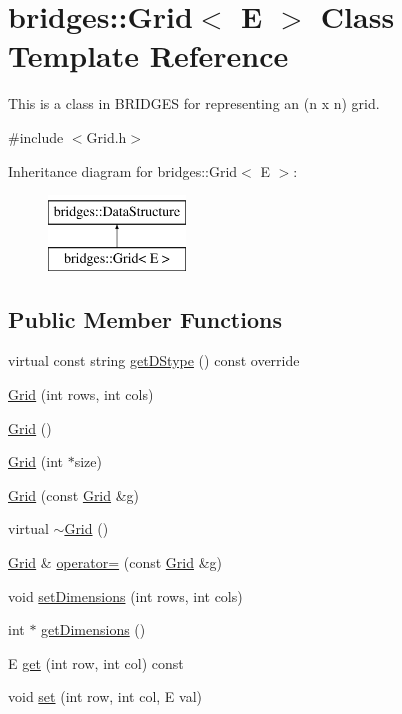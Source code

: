 \hypertarget{classbridges_1_1_grid}{}\section{bridges\+:\+:Grid$<$ E $>$ Class Template Reference}
\label{classbridges_1_1_grid}


This is a class in B\+R\+I\+D\+G\+E\+S for representing an (n x n) grid.  




{\ttfamily \#include $<$Grid.\+h$>$}

Inheritance diagram for bridges\+:\+:Grid$<$ E $>$\+:\begin{figure}[H]
\begin{center}
\leavevmode
\includegraphics[height=2.000000cm]{classbridges_1_1_grid}
\end{center}
\end{figure}
\subsection*{Public Member Functions}
\begin{DoxyCompactItemize}
\item 
virtual const string \hyperlink{classbridges_1_1_grid_a02561695978011f50894938b78969913}{get\+D\+Stype} () const  override
\item 
\hyperlink{classbridges_1_1_grid_af8bb9244c4c713f2325af6d4754ad1e9}{Grid} (int rows, int cols)
\item 
\hyperlink{classbridges_1_1_grid_a711e05a933c2a11c9e2775c74e6cf80d}{Grid} ()
\item 
\hyperlink{classbridges_1_1_grid_ad5c6c5e87eb40446ac794c5479937f87}{Grid} (int $\ast$size)
\item 
\hyperlink{classbridges_1_1_grid_aff3e633c9454fbc66cab5ffe0c6812db}{Grid} (const \hyperlink{classbridges_1_1_grid}{Grid} \&g)
\item 
virtual \hyperlink{classbridges_1_1_grid_a46cc94397ea38211349b10e3629b2590}{$\sim$\+Grid} ()
\item 
\hyperlink{classbridges_1_1_grid}{Grid} \& \hyperlink{classbridges_1_1_grid_ad5b960f574d1f5bddfffbfd8ce2d870b}{operator=} (const \hyperlink{classbridges_1_1_grid}{Grid} \&g)
\item 
void \hyperlink{classbridges_1_1_grid_a8e5e4d92097f9d1481a14219eb5cc5a8}{set\+Dimensions} (int rows, int cols)
\item 
int $\ast$ \hyperlink{classbridges_1_1_grid_ad21e4fc94483ef822fda9b74a52b9f48}{get\+Dimensions} ()
\item 
E \hyperlink{classbridges_1_1_grid_af8de793efe5503a9f12d890482b6e117}{get} (int row, int col) const 
\item 
void \hyperlink{classbridges_1_1_grid_acd750e5886349488257aba85f0b06f6f}{set} (int row, int col, E val)
\end{DoxyCompactItemize}
